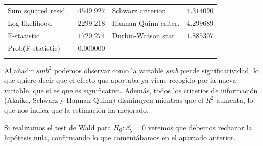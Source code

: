 \documentclass[12pt]{article}
\numberwithin{equation}{section} %
\begin{document}
\begin{table}[H]
\begin{tabular}{lrrrr}
\multicolumn{1}{l}{Sum squared resid}&\multicolumn{1}{r}{$4549.927$}&\multicolumn{2}{l}{Schwarz criterion}&\multicolumn{1}{r}{$4.314090$}\\
\multicolumn{1}{l}{Log likelihood}&\multicolumn{1}{r}{$-2299.218$}&\multicolumn{2}{l}{Hannan-Quinn criter.}&\multicolumn{1}{r}{$4.299689$}\\
\multicolumn{1}{l}{F-statistic}&\multicolumn{1}{r}{$1720.274$}&\multicolumn{2}{l}{Durbin-Watson stat}&\multicolumn{1}{r}{$1.885307$}\\
\multicolumn{1}{l}{Prob(F-statistic)}&\multicolumn{1}{r}{$0.000000$}&\multicolumn{1}{c}{}&\multicolumn{1}{c}{}&\multicolumn{1}{c}{}\\
[4.5pt] \hline \\ [-4.5pt]
\end{tabular}
\end{table}

Al añadir $smb^2$ podemos observar como la variable \textit{smb} pierde significatividad, lo que quiere decir que el efecto que aportaba ya viene recogido por la nueva variable, que sí es que es significativa. Además, todos los criterios de información (Akaike, Schwarz y Hannan-Quinn) disminuyen mientras que el $R^2$ aumenta, lo que nos indica que la estimación ha mejorado.

Si realizamos el test de Wald para $H_0: \beta_5 = 0$ veremos que debemos rechazar la hipótesis nula, confirmando lo que comentábamos en el apartado anterior.
\end{document}
